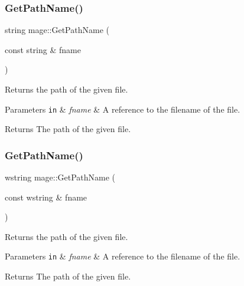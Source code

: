 \hypertarget{namespacemage_ac5c99281501e7af99e9fd0c332f0e113}{}\label{namespacemage_ac5c99281501e7af99e9fd0c332f0e113} 
\subsubsection{\texorpdfstring{Get\+Path\+Name()}{GetPathName()}\hspace{0.1cm}{\footnotesize\ttfamily [1/2]}}
{\footnotesize\ttfamily string mage\+::\+Get\+Path\+Name (\begin{DoxyParamCaption}\item[{const string \&}]{fname }\end{DoxyParamCaption})}

Returns the path of the given file.


\begin{DoxyParams}[1]{Parameters}
\mbox{\tt in}  & {\em fname} & A reference to the filename of the file. \\
\hline
\end{DoxyParams}
\begin{DoxyReturn}{Returns}
The path of the given file. 
\end{DoxyReturn}
\hypertarget{namespacemage_a171139f90ae3facdae52a61d5d73ddfa}{}\label{namespacemage_a171139f90ae3facdae52a61d5d73ddfa} 
\subsubsection{\texorpdfstring{Get\+Path\+Name()}{GetPathName()}\hspace{0.1cm}{\footnotesize\ttfamily [2/2]}}
{\footnotesize\ttfamily wstring mage\+::\+Get\+Path\+Name (\begin{DoxyParamCaption}\item[{const wstring \&}]{fname }\end{DoxyParamCaption})}

Returns the path of the given file.


\begin{DoxyParams}[1]{Parameters}
\mbox{\tt in}  & {\em fname} & A reference to the filename of the file. \\
\hline
\end{DoxyParams}
\begin{DoxyReturn}{Returns}
The path of the given file. 
\end{DoxyReturn}
\hypertarget{namespacemage_ac1483742feeec0594478127d4550b42f}{}\label{namespacemage_ac1483742feeec0594478127d4550b42f} 
